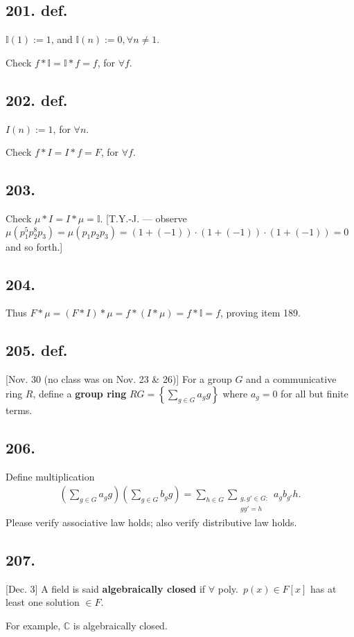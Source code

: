 \documentclass[12pt]{article}
\newcommand\M\cdot%
\newcommand\Ev\forall%
\newcommand{\Rb}[1]{ \left( #1 \right) }%
\newcommand{\Cb}[1]{ \left\{ #1 \right\} }%
\newcommand{\BF}[1]{ \mathbb{#1} }%
\newcommand{\Ss}[1]{\textsf{\bfseries{#1}}}%
\newcommand{\EqGo}[1]{ \begin{gather*}{#1}\end{gather*} } %
\begin{document}
\subsection*{201. def.} \(\BF{I}(1) :=1\), and \(\BF{I}(n) :=0, \Ev n \neq 1\). \par
Check \(f *\BF{I} =\BF{I} *f =f\), for \(\Ev f\). 

\subsection*{202. def.} \(I(n) :=1\), for \(\Ev n\). \par
Check \(f *I =I *f =F\), for \(\Ev f\). 

\subsection*{203.} Check \(\mu *I =I *\mu =\BF{I}\). 
[T.Y.-J. --- observe \(\mu\Rb{p_1^5 p_2^8 p_3} =\mu(p_1 p_2 p_3) =(1+(-1)) \M (1+(-1)) \M (1+(-1)) =0\) and so forth.]

\subsection*{204.} Thus \(F *\mu =(F *I) *\mu =f *(I *\mu) =f *\BF{I} =f\), proving item 189. 

\subsection*{205. def.} [Nov. 30 (no class was on Nov. 23 \& 26)] For a group \(G\) and a communicative ring \(R\), define a \Ss{group ring} \(RG =\Cb{ \sum_{g \in G} a_g g } \) where \(a_g =0\) for all but finite terms. 

\subsection*{206.} Define multiplication \EqGo{
 \Rb{ \sum_{g \in G} a_g g } \Rb{ \sum_{g \in G} b_g g }
 = \sum_{h \in G} \sum_{\substack{g,g' \in G: \\ gg' =h}} a_g b_{g'} h.
} Please verify associative law holds; also verify distributive law holds. 

\subsection*{207.} [Dec. 3] A field is said \Ss{algebraically closed} if \(\Ev\) poly.\ \(p(x) \in F[x]\) has at least one solution \(\in F\). \par
For example, \(\BF{C}\) is algebraically closed. 
\end{document}
